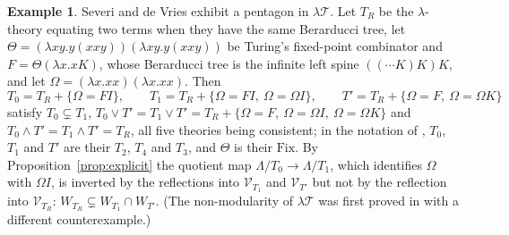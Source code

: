 \documentclass[11pt]{amsart}
\theoremstyle{definition}
\newtheorem{ex}[thm]{Example}
\newcommand{\sV}{\mathcal V}
\newcommand{\lT}{\lambda\mathcal T}
\begin{document}
\begin{ex}\label{ex:sdv}
Severi and de Vries \cite[Thm.~44]{SdV} exhibit a pentagon in $\lT$. Let
$T_R$ be the $\lambda$-theory equating two terms when they have the same
Berarducci tree, let $\Theta=(\lambda xy.y(xxy))(\lambda xy.y(xxy))$ be
Turing's fixed-point combinator and $F=\Theta(\lambda x.xK)$, whose Berarducci
tree is the infinite left spine $((\cdots K)K)K$, and let
$\Omega=(\lambda x.xx)(\lambda x.xx)$. Then
\[
T_0=T_R+\{\Omega=FI\},\qquad
T_1=T_R+\{\Omega=FI,\ \Omega=\Omega I\},\qquad
T'=T_R+\{\Omega=F,\ \Omega=\Omega K\}
\]
satisfy $T_0\subsetneq T_1$, $T_0\vee T'=T_1\vee T'=T_R+\{\Omega=F,\
\Omega=\Omega I,\ \Omega=\Omega K\}$ and $T_0\wedge T'=T_1\wedge T'=T_R$, all
five theories being consistent; in the notation of \cite[Thm.~44]{SdV},
$T_0$, $T_1$ and $T'$ are their $T_2$, $T_4$ and $T_3$, and $\Theta$ is their
$\mathrm{Fix}$. By Proposition~\ref{prop:explicit} the
quotient map $\Lambda/T_0\to\Lambda/T_1$, which identifies $\Omega$ with
$\Omega I$, is inverted by the reflections into $\sV_{T_1}$ and $\sV_{T'}$ but
not by the reflection into $\sV_{T_R}$: $W_{T_R}\subsetneq W_{T_1}\cap W_{T'}$.
(The non-modularity of $\lT$ was first proved in \cite{Salibra01} with a
different counterexample.)
\end{ex}
\end{document}
